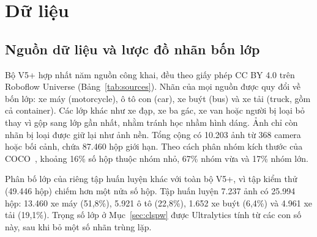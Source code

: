 \documentclass[10pt,journal,a4paper]{IEEEtran}
\begin{document}
\section{Dữ liệu}\label{sec:data}
\subsection{Nguồn dữ liệu và lược đồ nhãn bốn lớp}
Bộ V5+ hợp nhất năm nguồn công khai, đều theo giấy phép CC BY 4.0 trên Roboflow Universe (Bảng~\ref{tab:sources}). Nhãn của mọi nguồn được quy đổi về bốn lớp: xe máy (motorcycle), ô tô con (car), xe buýt (bus) và xe tải (truck, gồm cả container). Các lớp khác như xe đạp, xe ba gác, xe van hoặc người bị loại bỏ thay vì gộp sang lớp gần nhất, nhằm tránh học nhầm hình dáng. Ảnh chỉ còn nhãn bị loại được giữ lại như ảnh nền. Tổng cộng có 10.203 ảnh từ 368 camera hoặc bối cảnh, chứa 87.460 hộp giới hạn. Theo cách phân nhóm kích thước của COCO~\cite{coco}, khoảng 16\% số hộp thuộc nhóm nhỏ, 67\% nhóm vừa và 17\% nhóm lớn.

\begin{table}[!t]
\centering
\caption{Các nguồn dữ liệu của bộ V5+ (số ảnh sau lấy mẫu, số camera hoặc bối cảnh, số hộp theo lớp)}
\label{tab:sources}
\end{table}

Phân bố lớp của riêng tập huấn luyện khác với toàn bộ V5+, vì tập kiểm thử (49.446 hộp) chiếm hơn một nửa số hộp. Tập huấn luyện 7.237 ảnh có 25.994 hộp: 13.460 xe máy (51,8\%), 5.921 ô tô (22,8\%), 1.652 xe buýt (6,4\%) và 4.961 xe tải (19,1\%). Trọng số lớp ở Mục~\ref{sec:clspw} được Ultralytics tính từ các con số này, sau khi bỏ một số nhãn trùng lặp.
\end{document}
